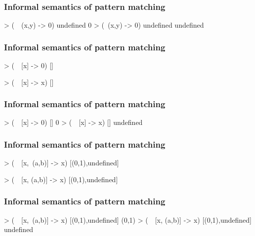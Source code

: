 \documentclass{beamer}
\begin{document}
\begin{frame}[fragile]
  \frametitle{Informal semantics of pattern matching}

  \begin{example}
    \begin{code}
> (\ ~(x,y) -> 0) undefined
0
> (\  (x,y) -> 0) undefined
undefined
    \end{code}
  \end{example}
\end{frame}


\begin{frame}[fragile]
  \frametitle{Informal semantics of pattern matching}

  \begin{example}
    \begin{code}
> (\ ~[x] -> 0) []

> (\ ~[x] -> x) []

    \end{code}
  \end{example}
\end{frame}

\begin{frame}[fragile]
  \frametitle{Informal semantics of pattern matching}

  \begin{example}
    \begin{code}
> (\ ~[x] -> 0) []
0
> (\ ~[x] -> x) []
undefined
    \end{code}
  \end{example}
\end{frame}


\begin{frame}[fragile]
  \frametitle{Informal semantics of pattern matching}

  \begin{example}
    \begin{code}
> (\ ~[x,~(a,b)] -> x) [(0,1),undefined]

> (\ ~[x, (a,b)] -> x) [(0,1),undefined]

    \end{code}
  \end{example}
\end{frame}

\begin{frame}[fragile]
  \frametitle{Informal semantics of pattern matching}

  \begin{example}
    \begin{code}
> (\ ~[x,~(a,b)] -> x) [(0,1),undefined]
(0,1)
> (\ ~[x, (a,b)] -> x) [(0,1),undefined]
undefined
    \end{code}
  \end{example}
\end{frame}
\end{document}

